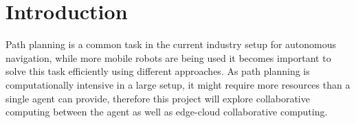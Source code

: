 \chapter{Introduction}
Path planning is a common task in the current industry setup for autonomous navigation, while more mobile robots are being used it becomes important to solve this task efficiently using different approaches. As path planning is computationally intensive in a large setup, it might require more resources than a single agent can provide, therefore this project will explore collaborative computing between the agent as well as edge-cloud collaborative computing.